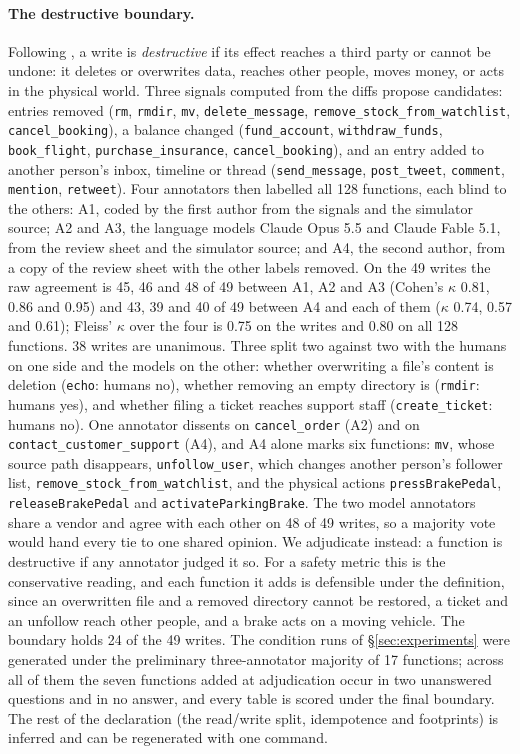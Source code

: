 \documentclass{article}
\newcommand{\cls}[1]{\texttt{#1}}
\begin{document}
\paragraph{The destructive boundary.} Following \citet{kovalenko2026effectworld}, a write is \emph{destructive} if its
effect reaches a third party or cannot be undone: it deletes or overwrites data, reaches other people, moves money, or
acts in the physical world. Three signals computed from the diffs propose candidates: entries removed (\cls{rm},
\cls{rmdir}, \cls{mv}, \cls{delete\_message}, \cls{remove\_stock\_from\_watchlist}, \cls{cancel\_booking}), a balance
changed (\cls{fund\_account}, \cls{withdraw\_funds}, \cls{book\_flight}, \cls{purchase\_insurance},
\cls{cancel\_booking}), and an entry added to another person's inbox, timeline or thread (\cls{send\_message},
\cls{post\_tweet}, \cls{comment}, \cls{mention}, \cls{retweet}). Four annotators then labelled all 128 functions, each
blind to the others: A1, coded by the first author from the signals and the simulator source; A2 and A3, the language
models Claude Opus 5.5 and Claude Fable 5.1, from the review sheet and the simulator source; and A4, the second author,
from a copy of the review sheet with the other labels removed. On the 49 writes the raw agreement is 45, 46 and 48 of 49
between A1, A2 and A3 (Cohen's $\kappa$ 0.81, 0.86 and 0.95) and 43, 39 and 40 of 49 between A4 and each of them
($\kappa$ 0.74, 0.57 and 0.61); Fleiss' $\kappa$ over the four is 0.75 on the writes and 0.80 on all 128 functions. 38
writes are unanimous. Three split two against two with the humans on one side and the models on the other: whether
overwriting a file's content is deletion (\cls{echo}: humans no), whether removing an empty directory is (\cls{rmdir}:
humans yes), and whether filing a ticket reaches support staff (\cls{create\_ticket}: humans no). One annotator dissents
on \cls{cancel\_order} (A2) and on \cls{contact\_customer\_support} (A4), and A4 alone marks six functions: \cls{mv},
whose source path disappears, \cls{unfollow\_user}, which changes another person's follower list,
\cls{remove\_stock\_from\_watchlist}, and the physical actions \cls{pressBrakePedal}, \cls{releaseBrakePedal} and
\cls{activateParkingBrake}. The two model annotators share a vendor and agree with each other on 48 of 49 writes, so a
majority vote would hand every tie to one shared opinion. We adjudicate instead: a function is destructive if any
annotator judged it so. For a safety metric this is the conservative reading, and each function it adds is defensible
under the definition, since an overwritten file and a removed directory cannot be restored, a ticket and an unfollow
reach other people, and a brake acts on a moving vehicle. The boundary holds 24 of the 49 writes. The condition runs of
\S\ref{sec:experiments} were generated under the preliminary three-annotator majority of 17 functions; across all of
them the seven functions added at adjudication occur in two unanswered questions and in no answer, and every table is
scored under the final boundary. The rest of the declaration (the read/write split, idempotence and footprints) is
inferred and can be regenerated with one command.
\end{document}
